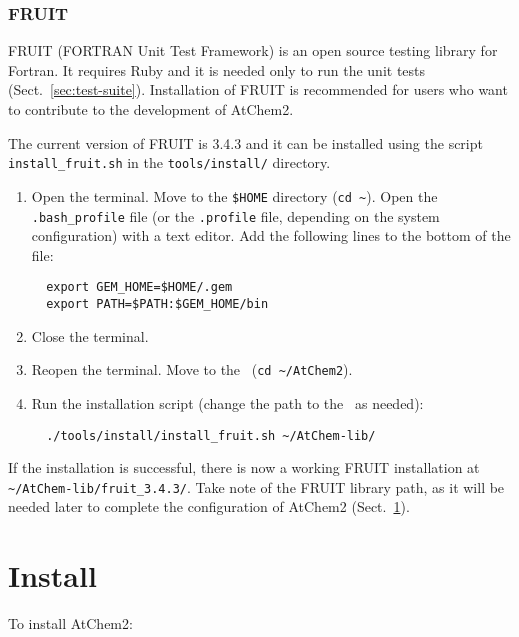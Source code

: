 \subsubsection{FRUIT}

FRUIT (FORTRAN Unit Test Framework) is an open source testing library
for Fortran. It requires Ruby and it is needed only to run the unit
tests (Sect.~\ref{sec:test-suite}). Installation of FRUIT is
recommended for users who want to contribute to the development of
AtChem2.

The current version of FRUIT is 3.4.3 and it can be installed using
the script \texttt{install\_fruit.sh} in the \texttt{tools/install/}
directory.

\begin{enumerate}
\item Open the terminal. Move to the \texttt{\$HOME} directory
  (\texttt{cd\ \textasciitilde}). Open the \texttt{.bash\_profile}
  file (or the \texttt{.profile} file, depending on the system
  configuration) with a text editor. Add the following lines to the
  bottom of the file:
  \begin{verbatim}
  export GEM_HOME=$HOME/.gem
  export PATH=$PATH:$GEM_HOME/bin
  \end{verbatim}
\item Close the terminal.
\item Reopen the terminal. Move to the \maindir\ (\verb|cd ~/AtChem2|).
\item Run the installation script (change the path to the \depdir\ as
  needed):
  \begin{verbatim}
  ./tools/install/install_fruit.sh ~/AtChem-lib/
  \end{verbatim}
\end{enumerate}

If the installation is successful, there is now a working FRUIT
installation at \texttt{\textasciitilde/AtChem-lib/fruit\_3.4.3/}.
Take note of the FRUIT library path, as it will be needed later to
complete the configuration of AtChem2 (Sect.~\ref{sec:install}).


\section{Install} \label{sec:install}

To install AtChem2:

